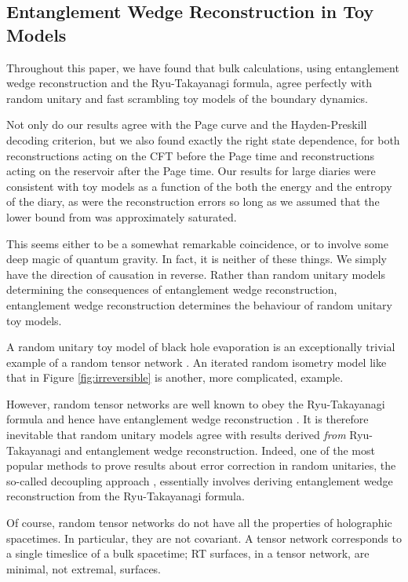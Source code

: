 \documentclass[11pt,a4paper]{article}
\begin{document}
\subsection{Entanglement Wedge Reconstruction in Toy Models}
Throughout this paper, we have found that bulk calculations, using entanglement wedge reconstruction and the Ryu-Takayanagi formula, agree perfectly with random unitary and fast scrambling toy models of the boundary dynamics. 

Not only do our results agree with the Page curve and the Hayden-Preskill decoding criterion, but we also found exactly the right state dependence, for both reconstructions acting on the CFT before the Page time and reconstructions acting on the reservoir after the Page time. Our results for large diaries were consistent with toy models as a function of the both the energy and the entropy of the diary, as were the reconstruction errors so long as we assumed that the lower bound from \cite{hayden2018learning} was approximately saturated.

This seems either to be a somewhat remarkable coincidence, or to involve some deep magic of quantum gravity. In fact, it is neither of these things. We simply have the direction of causation in reverse. Rather than random unitary models determining the consequences of entanglement wedge reconstruction, entanglement wedge reconstruction determines the behaviour of random unitary toy models.

A random unitary toy model of black hole evaporation is an exceptionally trivial example of a random tensor network \cite{hayden2016holographic}. An iterated random isometry model like that in Figure \ref{fig:irreversible} is another, more complicated, example.

However, random tensor networks are well known to obey the Ryu-Takayanagi formula and hence have entanglement wedge reconstruction \cite{hayden2016holographic}. It is therefore inevitable that random unitary models agree with results derived \emph{from} Ryu-Takayanagi and entanglement wedge reconstruction. Indeed, one of the most popular methods to prove results about error correction in random unitaries, the so-called decoupling approach \cite{hayden2008decoupling, dupuis2010decoupling}, essentially involves deriving entanglement wedge reconstruction from the Ryu-Takayanagi formula.

Of course, random tensor networks do not have all the properties of holographic spacetimes. In particular, they are not covariant. A tensor network corresponds to a single timeslice of a bulk spacetime; RT surfaces, in a tensor network, are minimal, not extremal, surfaces. 
\end{document}
